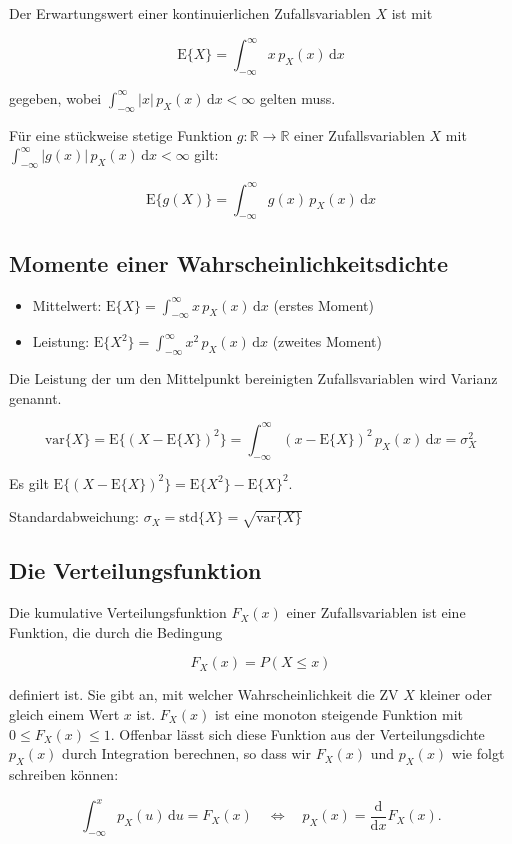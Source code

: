 Der Erwartungswert einer kontinuierlichen Zufallsvariablen $X$ ist mit

$$
\mathrm{E}\{X\} = \int_{-\infty}^{\infty} x\, p_X(x)\,\mathrm{d}x
$$

gegeben, wobei $\displaystyle\int_{-\infty}^{\infty} |x|\, p_X(x)\,\mathrm{d}x < \infty$ gelten muss.

Für eine stückweise stetige Funktion $g\colon \mathbb{R} \to \mathbb{R}$ einer Zufallsvariablen $X$ mit $\displaystyle\int_{-\infty}^{\infty} |g(x)|\, p_X(x)\,\mathrm{d}x < \infty$ gilt:

$$
\mathrm{E}\{g(X)\} = \int_{-\infty}^{\infty} g(x)\, p_X(x)\,\mathrm{d}x
$$

\subsection{Momente einer Wahrscheinlichkeitsdichte}
\label{sec:momente}

\begin{itemize}
  \item Mittelwert: $\mathrm{E}\{X\} = \displaystyle\int_{-\infty}^{\infty} x\, p_X(x)\,\mathrm{d}x$ \hfill (erstes Moment)
  \item Leistung: $\mathrm{E}\{X^2\} = \displaystyle\int_{-\infty}^{\infty} x^2\, p_X(x)\,\mathrm{d}x$ \hfill (zweites Moment)
\end{itemize}

Die Leistung der um den Mittelpunkt bereinigten Zufallsvariablen wird Varianz genannt.

$$
\mathrm{var}\{X\} = \mathrm{E}\{(X - \mathrm{E}\{X\})^2\} = \int_{-\infty}^{\infty} (x - \mathrm{E}\{X\})^2\, p_X(x)\,\mathrm{d}x = \sigma_X^2
$$

Es gilt $\mathrm{E}\{(X - \mathrm{E}\{X\})^2\} = \mathrm{E}\{X^2\} - \mathrm{E}\{X\}^2$.

Standardabweichung: $\sigma_X = \mathrm{std}\{X\} = \sqrt{\mathrm{var}\{X\}}$

\subsection{Die Verteilungsfunktion}
\label{sec:verteilungsfunktion}

\begin{definition}[Verteilungsfunktion]
Die kumulative Verteilungsfunktion $F_X(x)$ einer Zufallsvariablen ist eine Funktion, die durch die Bedingung

$$
F_X(x) = P(X \leq x)
$$

definiert ist. Sie gibt an, mit welcher Wahrscheinlichkeit die ZV $X$ kleiner oder gleich einem Wert $x$ ist. $F_X(x)$ ist eine monoton steigende Funktion mit $0 \leq F_X(x) \leq 1$. Offenbar lässt sich diese Funktion aus der Verteilungsdichte $p_X(x)$ durch Integration berechnen, so dass wir $F_X(x)$ und $p_X(x)$ wie folgt schreiben können:

$$
\int_{-\infty}^{x} p_X(u)\,\mathrm{d}u = F_X(x) \quad \Leftrightarrow \quad p_X(x) = \frac{\mathrm{d}}{\mathrm{d}x} F_X(x).
$$
\end{definition}

